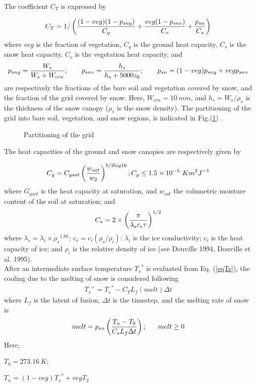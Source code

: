 The coefficient $C_T$ is expressed by

\begin{equation}
C_T=1 / \left(  {(1-veg)(1-p_{sng}) \over C_g}
    +       { veg(1-p_{snv}) \over C_v }
    +       { p_{sn} \over C_s } \right)
\end{equation}
where $veg$ is the fraction of vegetation, $C_g$ is the ground heat capacity,
$C_s$ is the snow heat capacity, $C_v$ is the vegetation heat capacity,
and
\begin{eqnarray}
p_{sng} = {W_s \over W_s + W_{crn} }; \ \ \ \ \ \
p_{snv} = { h_s \over h_s + 5000 z_0 }; \ \ \ \ \ \
p_{sn} = (1-veg) p_{sng} + veg p_{snv}
\end{eqnarray}
are respectively the fractions of the bare soil and vegetation
covered by snow, and the fraction of the grid covered by snow.
Here, $W_{crn} = 10 \ mm$, and
$h_s = W_s / \rho_s$ is the thickness of the snow canopy ($\rho_s$ is the
snow density).
The partitioning of the grid into bare soil, vegetation, and snow regions,
is indicated in Fig.(\ref{isba1}) .

\begin{figure}[h]
\caption{Partitioning of the grid \label{isba1}}
\end{figure}

The heat capacities of the ground and snow canopies are
respectively given by

\begin{equation}
C_g=C_{gsat} \left( {w_{sat} \over w_2} \right)^
{b / 2log10} ; C_g \leq 1.5 \times 10^{-5} \ K m^2 J^{-1}
\end{equation}
where $G_{gsat}$ is the heat capacity at saturation, and $w_{sat}$ the
volumetric moisture content of the soil at saturation; and
\begin{equation}
C_s=2 \times \left( {\pi \over \lambda_s c_s \tau}
\right)^{1/2}
\end{equation}
where $\lambda_s = \lambda_i \times {\rho_s}^{1.88}$;
$c_s = c_i (\rho_s / \rho_i)$:
$\lambda_i$ is the ice conductivity;
$c_i$ is the heat capacity
of ice; and $\rho_i$ is the relative density
of ice (see Douville 1994, Douville et al. 1995).
\\

After an intermediate surface
temperature ${T_s}^*$ is evaluated from Eq. (\ref{eqTs}), the cooling
due to the melting of snow is considered following
\begin{eqnarray}
{T_s}^+ = {T_s}^* - C_T L_f (melt) \Delta t
\end{eqnarray}
where $L_f$ is the latent of fusion, $\Delta t$ is the timestep,
and the melting rate of snow is
\begin{eqnarray}
melt = p_{sn} \left( { T_n - T_0 \over C_s L_f \Delta t } \right); \ \ \ \ \
melt \geq 0
\end{eqnarray}
Here,
\par $T_0=273.16 \ K$;
\par $T_n = (1-veg) {T_s}^* + veg T_2$

